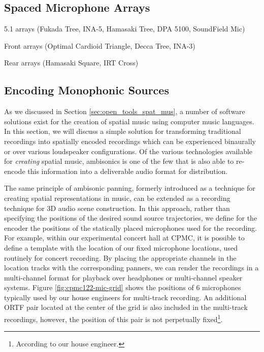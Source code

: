 \subsection{Spaced Microphone Arrays}


5.1 arrays (Fukada Tree, INA-5, Hamasaki Tree, DPA 5100, SoundField Mic)

Front arrays (Optimal Cardioid Triangle, Decca Tree, INA-3)

Rear arrays (Hamasaki Square, IRT Cross)


\subsection{Encoding Monophonic Sources}

As we discussed in Section \ref{sec:open_tools_spat_mus}, a number of software solutions exist for the creation of spatial music using computer music languages. In this section, we will discuss a simple solution for transforming traditional recordings into spatially encoded recordings which can be experienced binaurally or over various loudspeaker configurations. Of the various technologies available for \textit{creating} spatial music, ambisonics is one of the few that is also able to re-encode this information into a deliverable audio format for distribution. 


The same principle of ambisonic panning, formerly introduced as a technique for creating spatial representations in music, can be extended as a recording technique for 3D audio scene construction. In this approach, rather than specifying the positions of the desired sound source trajectories, we define for the encoder the positions of the statically placed microphones used for the recording. For example, within our experimental concert hall at CPMC, it is possible to define a template with the location of our fixed microphone locations, used routinely for concert recording. By placing the appropriate channels in the location tracks with the corresponding panners, we can render the recordings in a multi-channel format for playback over headphones or multi-channel speaker systems. Figure \ref{fig:cpmc122-mic-grid} shows the positions of 6 microphones typically used by our house engineers for multi-track recording. An additional ORTF pair located at the center of the grid is also included in the multi-track recordings, however, the position of this pair is not perpetually fixed\footnote{According to our house engineer.}. 

